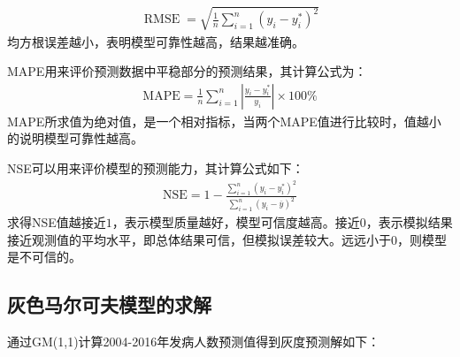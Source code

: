 \documentclass{whutmod}
\begin{document}
	   	\begin{gather*}
\operatorname{RMSE}=\sqrt{\frac{1}{n} \sum_{i=1}^{n}\left(y_{i}-y_{i}^{*}\right)^{2}}
	   	\end{gather*}   
	   均方根误差越小，表明模型可靠性越高，结果越准确。
	    
	     MAPE用来评价预测数据中平稳部分的预测结果，其计算公式为：
	    \begin{gather*}
\mathrm{MAPE}=\frac{1}{n} \sum_{i=1}^{n}\left|\frac{y_{i}-y_{i}^{*}}{y_{i}}\right| \times 100 \%
	     \end{gather*}
	     MAPE所求值为绝对值，是一个相对指标，当两个MAPE值进行比较时，值越小的说明模型可靠性越高。
	     
	       NSE可以用来评价模型的预测能力，其计算公式如下：
	       	\begin{gather*}
\mathrm{NSE}=1-\frac{\sum_{i=1}^{n}\left(y_{i}-y_{i}^{*}\right)^{2}}{\sum_{i=1}^{n}\left(y_{i}-\overline{y}\right)^{2}}       
	       \end{gather*}
	       求得NSE值越接近$1$，表示模型质量越好，模型可信度越高。接近$0$，表示模拟结果接近观测值的平均水平，即总体结果可信，但模拟误差较大。远远小于$0$，则模型是不可信的。
	   
	   
	   
	\subsection{灰色马尔可夫模型的求解}   
	  通过GM(1,1)计算2004-2016年发病人数预测值得到灰度预测解如下：
	  

%	  
\end{document}
